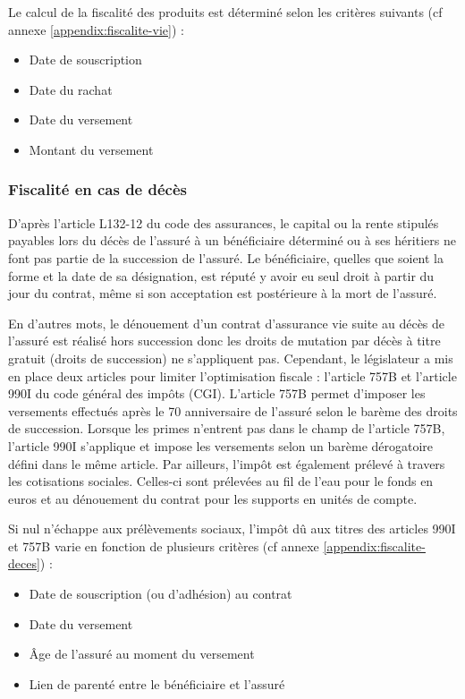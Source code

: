 \documentclass{article}
\begin{document}
Le calcul de la fiscalité des produits est déterminé selon les critères suivants (cf annexe \ref{appendix:fiscalite-vie}) :
\begin{itemize}
    \item Date de souscription 
    \item Date du rachat
    \item Date du versement
    \item Montant du versement
\end{itemize}

\subsubsection{Fiscalité en cas de décès}
D'après l'article L132-12 du code des assurances, \og le capital ou la rente stipulés payables lors du décès de l'assuré à un bénéficiaire déterminé ou à ses héritiers ne font pas partie de la succession de l'assuré. Le bénéficiaire, quelles que soient la forme et la date de sa désignation, est réputé y avoir eu seul droit à partir du jour du contrat, même si son acceptation est postérieure à la mort de l'assuré. \fg 

En d'autres mots, le dénouement d'un contrat d'assurance vie suite au décès de l'assuré est réalisé hors succession donc les droits de mutation par décès à titre gratuit (droits de succession) ne s'appliquent pas. Cependant, le législateur a mis en place deux articles pour limiter l'optimisation fiscale : l'article 757B et l'article 990I du code général des impôts (CGI). L'article 757B permet d'imposer les versements effectués après le 70 anniversaire de l'assuré selon le barème des droits de succession. Lorsque les primes n'entrent pas dans le champ de l'article 757B, l'article 990I s'applique et impose les versements selon un barème dérogatoire défini dans le même article. Par ailleurs, l'impôt est également prélevé à travers les cotisations sociales. Celles-ci sont prélevées au fil de l'eau pour le fonds en euros et au dénouement du contrat pour les supports en unités de compte. 

Si nul n'échappe aux prélèvements sociaux, l'impôt dû aux titres des articles 990I et 757B varie en fonction de plusieurs critères (cf annexe \ref{appendix:fiscalite-deces}) :
\begin{itemize}
    \item Date de souscription (ou d'adhésion) au contrat
    \item Date du versement
    \item Âge de l'assuré au moment du versement
    \item Lien de parenté entre le bénéficiaire et l'assuré
\end{itemize}
\end{document}
